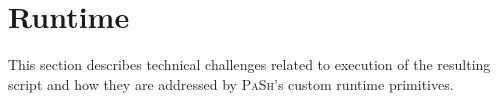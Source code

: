 \documentclass[sigplan, review, screen, anonymous]{acmart}
\newcommand{\todo}[1]{\hl{#1}\xspace}
\newcommand{\kk}[1]{[{\color{magenta}kk: #1}]}
\newcommand{\sys}{{\scshape PaSh}\xspace}
\begin{document}
\section{Runtime}
\label{impl}
\label{optimizer}


This section describes technical challenges related to execution of the resulting script and how they are addressed by \sys's custom runtime primitives.






\end{document}
